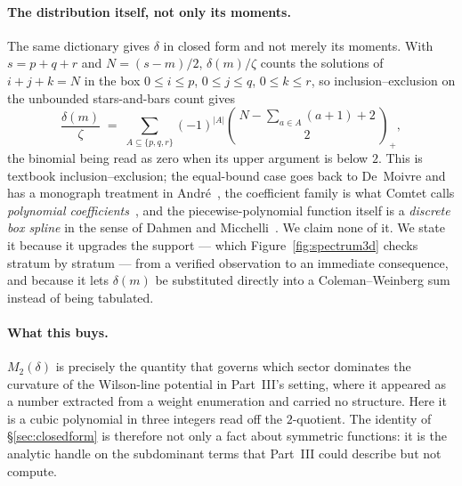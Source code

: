 \documentclass[11pt,a4paper]{article}
\begin{document}
\paragraph{The distribution itself, not only its moments.} The same dictionary gives $\delta$
in closed form and not merely its moments. With $s=p+q+r$ and $N=(s-m)/2$, $\delta(m)/\zeta$
counts the solutions of $i+j+k=N$ in the box $0\le i\le p$, $0\le j\le q$, $0\le k\le r$, so
inclusion--exclusion on the unbounded stars-and-bars count gives
\begin{equation}\label{eq:deltaclosed}
\frac{\delta(m)}{\zeta}\;=\;\sum_{A\subseteq\{p,q,r\}}(-1)^{|A|}
\binom{\,N-\sum_{a\in A}(a+1)+2\,}{2}_{\!\!+},
\end{equation}
the binomial being read as zero when its upper argument is below $2$. This is textbook
inclusion--exclusion; the equal-bound case goes back to De~Moivre and has a monograph treatment
in André~\cite{Andre}, the coefficient family is what Comtet calls \emph{polynomial
coefficients}~\cite[p.~77]{Comtet}, and the piecewise-polynomial function itself is a
\emph{discrete box spline} in the sense of Dahmen and Micchelli~\cite{DahmenMicchelli}. We
claim none of it. We state it because it upgrades the support --- which
Figure~\ref{fig:spectrum3d} checks stratum by stratum --- from a verified observation to an
immediate consequence, and because it lets $\delta(m)$ be substituted directly into a
Coleman--Weinberg sum instead of being tabulated.

\paragraph{What this buys.} $M_2(\delta)$ is precisely the quantity that governs which sector
dominates the curvature of the Wilson-line potential in Part~III's setting, where it appeared as
a number extracted from a weight enumeration and carried no structure. Here it is a cubic
polynomial in three integers read off the $2$-quotient. The identity of \S\ref{sec:closedform}
is therefore not only a fact about symmetric functions: it is the analytic handle on the
subdominant terms that Part~III could describe but not compute.
\end{document}
